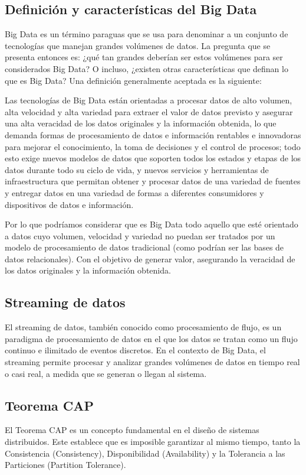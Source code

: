 \newpage
\subsection{Definición y características del Big Data}

Big Data es un término paraguas que se usa para denominar a un conjunto de tecnologías que manejan grandes volúmenes de datos.
La pregunta que se presenta entonces es: ¿qué tan grandes deberían ser estos volúmenes para ser considerados Big Data?
O incluso, ¿existen otras características que definan lo que es Big Data?
Una definición generalmente aceptada es la siguiente:
\bigskip

Las tecnologías de Big Data están orientadas a
procesar datos de alto volumen, alta velocidad y alta variedad
para extraer el valor de datos previsto y asegurar una alta
veracidad de los datos originales y la información obtenida, lo que demanda
formas de procesamiento de datos e información rentables e innovadoras
para mejorar el conocimiento, la toma de decisiones y el control de procesos;
todo esto exige nuevos modelos de datos
que soporten todos los estados y etapas de los datos durante todo su ciclo de vida, 
y nuevos servicios y herramientas de infraestructura que permitan obtener y procesar
datos de una variedad de fuentes y
entregar datos en una variedad de formas a diferentes consumidores y dispositivos
de datos e información. \parencite{demchenko2014addressing}

\newpage
Por lo que podríamos considerar que es Big Data todo aquello que esté orientado a datos
cuyo volumen, velocidad y variedad no puedan ser tratados por un modelo de procesamiento
de datos tradicional (como podrían ser las bases de datos relacionales). Con el objetivo
de generar valor, asegurando la veracidad de los datos originales y la información obtenida.

\subsection{Streaming de datos}

El streaming de datos, también conocido como procesamiento de flujo, es un paradigma 
de procesamiento de datos en el que los datos se tratan como un flujo continuo e 
ilimitado de eventos discretos. En el contexto de Big Data, el streaming permite procesar 
y analizar grandes volúmenes de datos en tiempo real o casi real, a medida que se generan 
o llegan al sistema. \parencite{flink}

\subsection{Teorema CAP}
El Teorema CAP es un concepto fundamental en el diseño de sistemas distribuidos. 
Este establece que es imposible garantizar al mismo tiempo, tanto la Consistencia (Consistency), 
Disponibilidad (Availability) y la Tolerancia a las Particiones (Partition Tolerance).

